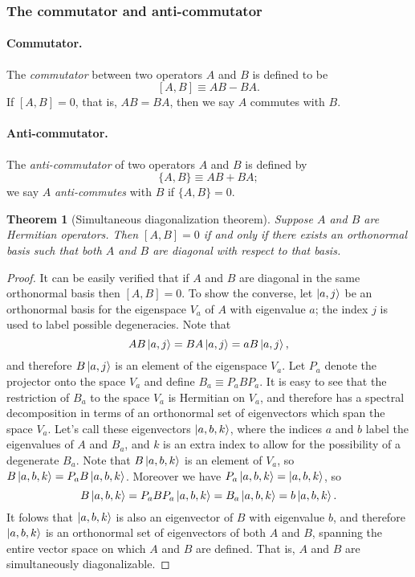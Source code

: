 \documentclass{article}
\newtheorem{theorem}{Theorem}
\numberwithin{theorem}{section}
\numberwithin{corollary}{section}
\numberwithin{postulate}{section}
\begin{document}
\subsubsection{The commutator and anti-commutator}

\paragraph{Commutator.} The \emph{commutator} between two operators $A$ and $B$
is defined to be \[
  [A, B] \equiv AB - BA.
\] If $[A, B] = 0$, that is, $AB = BA$, then we say $A$ commutes with $B$.

\paragraph{Anti-commutator.} The \emph{anti-commutator} of two operators $A$
and $B$ is defined by \[
  \{A, B\} \equiv AB + BA;
\] we say $A$ \emph{anti-commutes} with $B$ if $\{A, B\} = 0$.

\begin{theorem}[Simultaneous diagonalization theorem]
  Suppose $A$ and $B$ are Hermitian operators. Then $[A, B] = 0$ if and only if
  there exists an orthonormal basis such that both $A$ and $B$ are diagonal
  with respect to that basis.
\end{theorem}

\begin{proof}
  It can be easily verified that if $A$ and $B$ are diagonal in the same
  orthonormal basis then $[A, B] = 0$. To show the converse, let $\ket{a, j}$
  be an orthonormal basis for the eigenspace $V_a$ of $A$ with eigenvalue $a$;
  the index $j$ is used to label possible degeneracies. Note that \[
    AB\ket{a, j} = BA\ket{a, j} = aB\ket{a, j},
  \] and therefore $B\ket{a, j}$ is an element of the eigenspace $V_a$. Let
  $P_a$ denote the projector onto the space $V_a$ and define $B_a \equiv
  P_aBP_a$. It is easy to see that the restriction of $B_a$ to the space $V_a$
  is Hermitian on $V_a$, and therefore has a spectral decomposition in terms of
  an orthonormal set of eigenvectors which span the space $V_a$. Let's call
  these eigenvectors $\ket{a, b, k}$, where the indices $a$ and $b$ label the
  eigenvalues of $A$ and $B_a$, and $k$ is an extra index to allow for the
  possibility of a degenerate $B_a$. Note that $B\ket{a, b, k}$ is an element
  of $V_a$, so $B\ket{a, b, k} = P_aB\ket{a, b, k}$. Moreover we have
  $P_a\ket{a, b, k} = \ket{a, b, k}$, so \[
    B\ket{a, b, k} = P_aBP_a\ket{a, b, k} = B_a\ket{a, b, k} = b\ket{a, b, k}.
  \] It folows that $\ket{a, b, k}$ is also an eigenvector of $B$ with
  eigenvalue $b$, and therefore $\ket{a, b, k}$ is an orthonormal set of
  eigenvectors of both $A$ and $B$, spanning the entire vector space on which
  $A$ and $B$ are defined. That is, $A$ and $B$ are simultaneously
  diagonalizable.
\end{proof}
\end{document}
